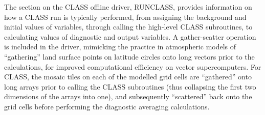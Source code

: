 The section on the C\+L\+A\+S\+S offline driver, R\+U\+N\+C\+L\+A\+S\+S, provides information on how a C\+L\+A\+S\+S run is typically performed, from assigning the background and initial values of variables, through calling the high-\/level C\+L\+A\+S\+S subroutines, to calculating values of diagnostic and output variables. A gather-\/scatter operation is included in the driver, mimicking the practice in atmospheric models of “gathering” land surface points on latitude circles onto long vectors prior to the calculations, for improved computational efficiency on vector supercomputers. For C\+L\+A\+S\+S, the mosaic tiles on each of the modelled grid cells are “gathered” onto long arrays prior to calling the C\+L\+A\+S\+S subroutines (thus collapsing the first two dimensions of the arrays into one), and subsequently “scattered” back onto the grid cells before performing the diagnostic averaging calculations.

